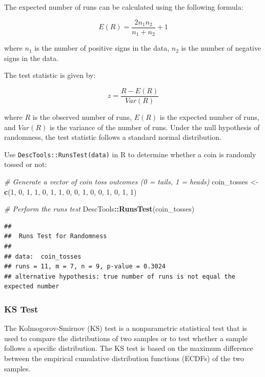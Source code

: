 \documentclass[
]{ctexart}
\newenvironment{Shaded}{\begin{snugshade}}{\end{snugshade}}
\newcommand{\CommentTok}[1]{\textcolor[rgb]{0.56,0.35,0.01}{\textit{#1}}}
\newcommand{\DecValTok}[1]{\textcolor[rgb]{0.00,0.00,0.81}{#1}}
\newcommand{\FunctionTok}[1]{\textcolor[rgb]{0.13,0.29,0.53}{\textbf{#1}}}
\newcommand{\NormalTok}[1]{#1}
\newcommand{\OtherTok}[1]{\textcolor[rgb]{0.56,0.35,0.01}{#1}}
\newcommand{\SpecialCharTok}[1]{\textcolor[rgb]{0.81,0.36,0.00}{\textbf{#1}}}
\begin{document}
The expected number of runs can be calculated using the following
formula:

\[
E(R)=\frac{2n_1n_2}{n_1+n_2}+1
\]

where \(n_1\) is the number of positive signs in the data, \(n_2\) is
the number of negative signs in the data.

The test statistic is given by:

\[
z=\frac{R-E(R)}{Var(R)}
\]

where \(R\) is the observed number of runs, \(E(R)\) is the expected
number of runs, and \(Var(R)\) is the variance of the number of runs.
Under the null hypothesis of randomness, the test statistic follows a
standard normal distribution.

Use \texttt{DescTools::RunsTest(data)} in R to determine whether a coin
is randomly tossed or not:

\begin{Shaded}
\begin{Highlighting}[]
\CommentTok{\# Generate a vector of coin toss outcomes (0 = tails, 1 = heads)}
\NormalTok{coin\_tosses }\OtherTok{\textless{}{-}} \FunctionTok{c}\NormalTok{(}\DecValTok{1}\NormalTok{, }\DecValTok{0}\NormalTok{, }\DecValTok{1}\NormalTok{, }\DecValTok{1}\NormalTok{, }\DecValTok{0}\NormalTok{, }\DecValTok{1}\NormalTok{, }\DecValTok{1}\NormalTok{, }\DecValTok{0}\NormalTok{, }
                 \DecValTok{0}\NormalTok{, }\DecValTok{1}\NormalTok{, }\DecValTok{0}\NormalTok{, }\DecValTok{0}\NormalTok{, }\DecValTok{1}\NormalTok{, }\DecValTok{0}\NormalTok{, }\DecValTok{1}\NormalTok{, }\DecValTok{1}\NormalTok{)}

\CommentTok{\# Perform the runs test}
\NormalTok{DescTools}\SpecialCharTok{::}\FunctionTok{RunsTest}\NormalTok{(coin\_tosses)}
\end{Highlighting}
\end{Shaded}

\begin{verbatim}
## 
##  Runs Test for Randomness
## 
## data:  coin_tosses
## runs = 11, m = 7, n = 9, p-value = 0.3024
## alternative hypothesis: true number of runs is not equal the expected number
\end{verbatim}

\hypertarget{ks-test}{%
\subsubsection{KS Test}\label{ks-test}}

The Kolmogorov-Smirnov (KS) test is a nonparametric statistical test
that is used to compare the distributions of two samples or to test
whether a sample follows a specific distribution. The KS test is based
on the maximum difference between the empirical cumulative distribution
functions (ECDFs) of the two samples.
\end{document}
